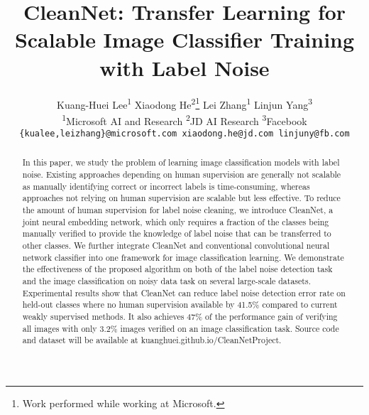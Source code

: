 \documentclass[10pt,twocolumn,letterpaper]{article}
\begin{document}
\setlength{\textfloatsep}{10pt plus 1.0pt minus 2.0pt}

\title{CleanNet: Transfer Learning for Scalable Image Classifier Training \newline with Label Noise\vspace{-0.7em}}

\author{Kuang-Huei Lee\textsuperscript{1} \qquad Xiaodong He\textsuperscript{2}\thanks{Work performed while working at Microsoft.} \qquad Lei Zhang\textsuperscript{1} \qquad Linjun Yang\textsuperscript{3}\footnotemark[1]\\
\textsuperscript{1}Microsoft AI and Research \qquad \textsuperscript{2}JD AI Research \qquad \textsuperscript{3}Facebook\\
{\tt\small \{kualee,leizhang\}@microsoft.com \qquad xiaodong.he@jd.com \qquad linjuny@fb.com}
}

\maketitle

\begin{abstract}
\vspace{-2.5mm}
In this paper, we study the problem of learning image classification models with label noise. Existing approaches depending on human supervision are generally not scalable as manually identifying correct or incorrect labels is time-consuming, whereas approaches not relying on human supervision are scalable but less effective. To reduce the amount of human supervision for label noise cleaning, we introduce CleanNet, a joint neural embedding network, which only requires a fraction of the classes being manually verified to provide the knowledge of label noise that can be transferred to other classes. We further integrate CleanNet and conventional convolutional neural network classifier into one framework for image classification learning. We demonstrate the effectiveness of the proposed algorithm on both of the label noise detection task and the image classification on noisy data task on several large-scale datasets. Experimental results show that CleanNet can reduce label noise detection error rate on held-out classes where no human supervision available by 41.5\% compared to current weakly supervised methods. It also achieves 47\% of the performance gain of verifying all images with only 3.2\% images verified on an image classification task. Source code and dataset will be available at kuanghuei.github.io/CleanNetProject.
\end{abstract}
\vspace{-2.5mm}
\end{document}
